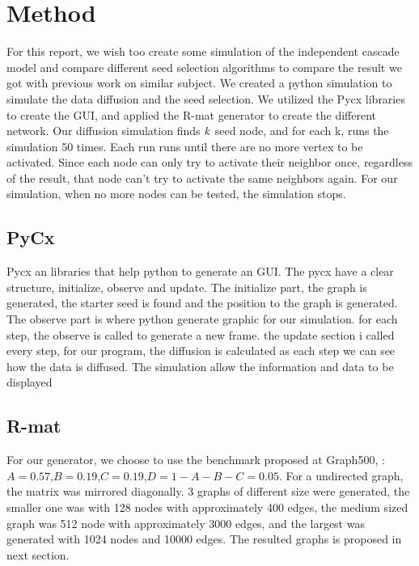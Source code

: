 \chapter{Method}
For this report, we wish too create some simulation of the independent cascade model and compare different seed selection algorithms to compare the result we got with previous work on similar subject\cite{MaximizeSpread2015}. We created a python simulation to simulate the data diffusion and the seed selection. We utilized the Pycx libraries to create the GUI, and applied the R-mat generator to create the different network. Our diffusion simulation finds $\it{k}$ seed node, and for each k, runs the simulation 50 times. Each run runs until there are no more vertex to be activated. Since each node can only try to activate their neighbor once, regardless of the result, that node can't try to activate the same neighbors again. For our simulation, when no more nodes can be tested, the simulation stops. 

\section{PyCx}
Pycx an libraries that help python to generate an GUI\cite{Pycx}. The pycx have a clear structure, initialize, observe and update. The initialize part, the graph is generated, the starter seed is found and the position to the graph is generated. The observe part is where python generate graphic for our simulation. for each step, the observe is called to generate a new frame. the update section i called every step, for our program, the diffusion is calculated as each step we can see how the data is diffused. The simulation allow the information and data to be displayed 


\section{R-mat}
For our generator, we choose to  use the benchmark proposed at Graph500, :$A=0.57$,$B=0.19$,$C=0.19$,$D = 1-A-B-C = 0.05$. For a undirected graph, the matrix was mirrored diagonally. 3 graphs of different size were generated, the smaller one was with 128 nodes with approximately 400 edges, the medium sized graph was 512 node with approximately 3000 edges, and the largest was generated with 1024 nodes and 10000 edges. The resulted graphs is proposed in next section. 

